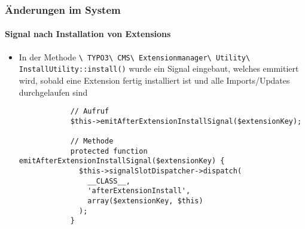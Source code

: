 \begin{frame}[fragile]
	\frametitle{Änderungen im System}
	\framesubtitle{Signal nach Installation von Extensions}

	\lstset{basicstyle=\tiny\ttfamily}

	\begin{itemize}

		\item In der Methode
			\smaller
				\texttt{\textbackslash
					TYPO3\textbackslash
					CMS\textbackslash
					Extensionmanager\textbackslash
					Utility\textbackslash
					InstallUtility::install()}
			\normalsize
			wurde ein Signal eingebaut, welches emmitiert wird, sobald eine Extension
			fertig installiert ist und alle Imports/Updates durchgelaufen sind

		\begin{lstlisting}
			// Aufruf
			$this->emitAfterExtensionInstallSignal($extensionKey);

			// Methode
			protected function emitAfterExtensionInstallSignal($extensionKey) {
			  $this->signalSlotDispatcher->dispatch(
			    __CLASS__,
			    'afterExtensionInstall',
			    array($extensionKey, $this)
			  );
			}
		\end{lstlisting}

	\end{itemize}

\end{frame}

